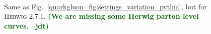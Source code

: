 \documentclass[11pt]{cernrep}
\newcommand{\jdt}[1]{\textbf{\textcolor{darkgreen}{(#1 --jdt)}}}
\begin{document}
\begin{figure}
\centering
{}
$\qquad$
\caption{Same as Fig.~\ref{quarkgluon_fig:settings_variation_pythia}, but for \textsc{Herwig 2.7.1}.  \jdt{We are missing some Herwig parton level curves.}}
\label{quarkgluon_fig:settings_variation_herwig}
\end{figure}
\end{document}
